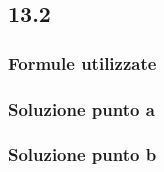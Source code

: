 \documentclass[../../main.tex]{subfiles}
\begin{document}
\subsection*{13.2}
\subsubsection*{Formule utilizzate}
\subsubsection*{Soluzione punto a}
\subsubsection*{Soluzione punto b}
\newpage
\end{document}
